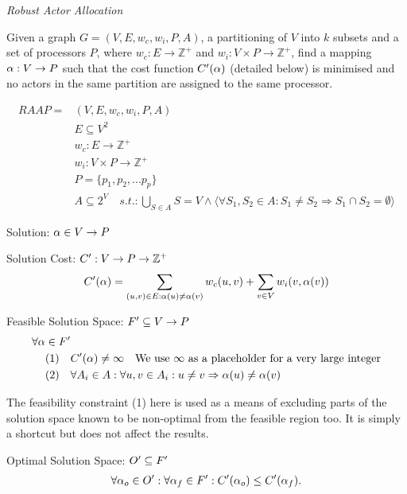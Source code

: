 \begin{definition}
{\em Robust Actor Allocation}

Given a graph $G=(V,E,w_c,w_i, P, A)$, a partitioning of $V$ into $k$ subsets and a set of processors $P$, where $w_c : E \rightarrow \mathbb{Z}^+$ and $w_i : V \times P \rightarrow \mathbb{Z}^+$, find a mapping $\alpha : V \rightarrow P$ such that
the cost function $C'(\alpha)$ (detailed below) is minimised and no actors in the same partition are assigned to the same processor.

\begin{align}
	\nonumber RAAP = & (V,E,w_c, w_i, P, A)\\
	\nonumber & E \subseteq V^2\\
	\nonumber & w_c : E \rightarrow \mathbb{Z}^+\\
	\nonumber & w_i : V \times P \rightarrow \mathbb{Z}^+\\
	\nonumber & P = \{p_1, p_2, ...p_p\} \\
	\nonumber & A \subseteq 2^V \quad s.t. : \displaystyle\bigcup\limits_{S \in A} S = V \wedge \langle \forall S_1, S_2 \in A : S_1 \neq S_2 \Rightarrow S_1 \cap S_2 = \emptyset \rangle
\end{align}

Solution: $\alpha \in V \rightarrow P$

Solution Cost: $C' : V \rightarrow P \rightarrow \mathbb{Z}^+$
\begin{align}
	\nonumber C'(\alpha) = \displaystyle\sum\limits_{(u,v) \in E : \alpha(u) \neq \alpha(v)} w_c(u,v) + \displaystyle\sum\limits_{v \in V} w_i(v, \alpha(v))
\end{align}

Feasible Solution Space: $F' \subseteq V \rightarrow P$
\begin{align}
	\nonumber \forall \alpha \in F' & \\
	\nonumber \mbox{(1)} \quad & C'(\alpha) \neq \infty \quad \mbox{We use $\infty$ as a placeholder for a very large integer} \\
	\nonumber \mbox{(2)} \quad & \forall A_i \in A : \forall u , v \in A_i : u \neq v \Rightarrow \alpha(u) \neq  \alpha(v)
\end{align}

\noindent The feasibility constraint (1) here is used as a means of excluding parts of the solution space known to be non-optimal from the feasible region too.
It is simply a shortcut but does not affect the results.

Optimal Solution Space: $O' \subseteq F'$
\begin{align}
	\nonumber 	\forall \alpha_o \in O' : \forall \alpha_f \in F' : C'(\alpha_o) \leq C'(\alpha_f).
\end{align}

\end{definition}


